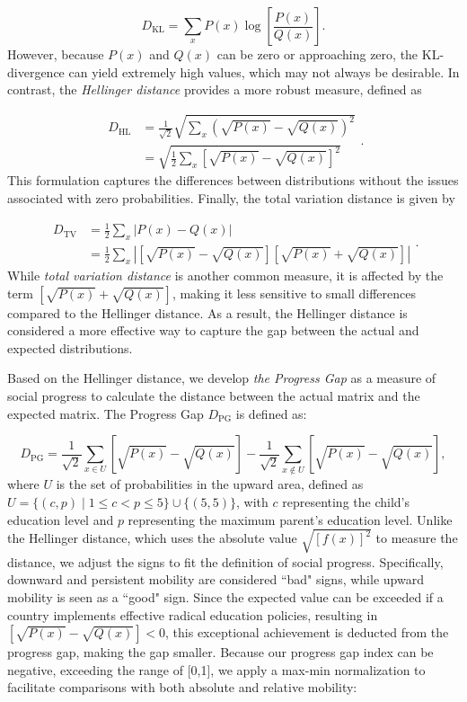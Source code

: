 \[
D_{\text{KL}} = \sum_{x} P(x) \log \left[ \frac{P(x)}{Q(x)} \right].
\]
However, because \( P(x) \) and \( Q(x) \) can be zero or approaching zero, the KL-divergence can yield extremely high values, which may not always be desirable. In contrast, the \textit{Hellinger distance} provides a more robust measure, defined as

\[
\begin{aligned}
D_{\text{HL}} &= \frac{1}{\sqrt{2}} \sqrt{\sum_{x} \left( \sqrt{P(x)} - \sqrt{Q(x)} \right)^2} \\
&= \sqrt{\frac{1}{2} \sum_{x} \left[ \sqrt{P(x)} - \sqrt{Q(x)} \right]^2}
\end{aligned}.
\]
This formulation captures the differences between distributions without the issues associated with zero probabilities. Finally, the total variation distance is given by

\[
\begin{aligned}
D_{\text{TV}} &= \frac{1}{2} \sum_{x} |P(x) - Q(x)| \\
&= \frac{1}{2} \sum_{x} \left| \left[ \sqrt{P(x)} - \sqrt{Q(x)} \right] \left[ \sqrt{P(x)} + \sqrt{Q(x)} \right] \right|
\end{aligned}.
\]
While \textit{total variation distance} is another common measure, it is affected by the term \(\left[ \sqrt{P(x)} + \sqrt{Q(x)} \right]\), making it less sensitive to small differences compared to the Hellinger distance. As a result, the Hellinger distance is considered a more effective way to capture the gap between the actual and expected distributions.

Based on the Hellinger distance, we develop \textit{the Progress Gap} as a measure of social progress to calculate the distance between the actual matrix and the expected matrix. The Progress Gap \( D_{\text{PG}} \) is defined as:

\[
D_{\text{PG}} = \frac{1}{\sqrt{2}} \sum_{x \in U} \left[ \sqrt{P(x)} - \sqrt{Q(x)} \right] - \frac{1}{\sqrt{2}} \sum_{x \notin U} \left[ \sqrt{P(x)} - \sqrt{Q(x)} \right],
\]
where \( U \) is the set of probabilities in the upward area, defined as \( U = \{ (c,p) \mid 1 \leq c < p \leq 5 \} \cup \{ (5,5) \} \), with \( c \) representing the child’s education level and \( p \) representing the maximum parent’s education level. Unlike the Hellinger distance, which uses the absolute value \( \sqrt{[f(x)]^2} \) to measure the distance, we adjust the signs to fit the definition of social progress. Specifically, downward and persistent mobility are considered ``bad" signs, while upward mobility is seen as a ``good" sign. Since the expected value can be exceeded if a country implements effective radical education policies, resulting in \( \left[\sqrt{P(x)} - \sqrt{Q(x)}\right] < 0 \), this exceptional achievement is deducted from the progress gap, making the gap smaller. Because our progress gap index can be negative, exceeding the range of [0,1], we apply a max-min normalization to facilitate comparisons with both absolute and relative mobility:


